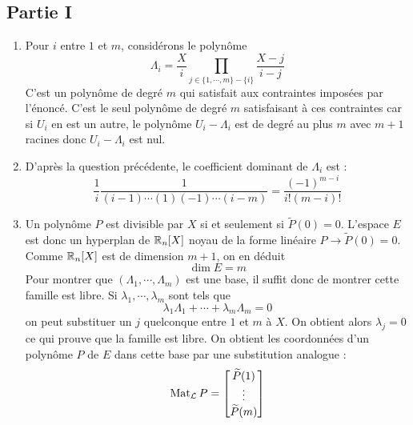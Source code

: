 \subsection*{Partie I}
\begin{enumerate}
 \item Pour $i$ entre $1$ et $m$, considérons le polynôme
\begin{displaymath}
 \Lambda_i = \dfrac{X}{i} \prod_{j\in \{1,\cdots, m\}-\{i\}} \dfrac{X-j}{i-j}
\end{displaymath}
C'est un polynôme de degré $m$ qui satisfait aux contraintes imposées par l'énoncé. C'est le seul polynôme de degré $m$ satisfaisant à ces contraintes car si $U_i$ en est un autre, le polynôme $U_i-\Lambda_i$ est de degré au plus $m$ avec $m+1$ racines donc $U_i-\Lambda_i$ est nul.
\item D'après la question précédente, le coefficient dominant de $\Lambda_i$ est :
\begin{displaymath}
 \dfrac{1}{i}\dfrac{1}{(i-1)\cdots (1)(-1)\cdots(i-m)} = \dfrac{(-1)^{m-i}}{i!(m-i)!}
\end{displaymath}

\item Un polynôme $P$ est divisible par $X$ si et seulement si $\widetilde{P}(0)=0$. L'espace $E$ est donc un  hyperplan de $\mathbb{R}_n[X]$ noyau de la forme linéaire $P\rightarrow \widetilde{P}(0)=0$. Comme $\mathbb{R}_n[X]$ est de dimension $m+1$, on en déduit
\begin{displaymath}
 \dim E = m
\end{displaymath}
Pour montrer que $(\Lambda_1,\cdots, \Lambda_m)$ est une base, il suffit donc de montrer cette famille est libre. Si $\lambda_1,\cdots,\lambda_m$ sont tels que 
\begin{displaymath}
\lambda_1 \Lambda_1 + \cdots +\lambda_m \Lambda_m = 0
\end{displaymath}
on peut substituer un $j$ quelconque entre $1$ et $m$ à $X$. On obtient alors 
$\lambda_j=0$ ce qui prouve que la famille est libre.\newline
On obtient les coordonnées d'un polynôme $P$ de $E$ dans cette base par une substitution analogue :
\begin{displaymath}
 \operatorname{Mat}_{\mathcal L} P = 
\begin{bmatrix}
 \widetilde{P}(1)\\
\vdots \\
\widetilde{P}(m)
\end{bmatrix}
\end{displaymath}


\end{enumerate}
